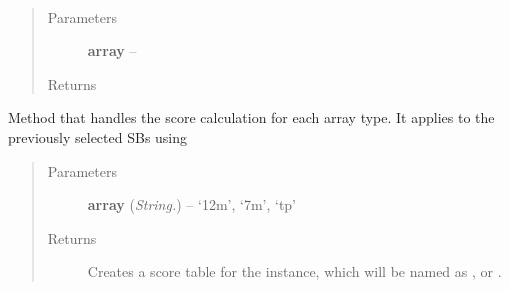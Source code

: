\documentclass[a4paper,10pt,english]{sphinxmanual}
\begin{document}
\begin{fulllineitems}
\begin{fulllineitems}
\end{fulllineitems}


\begin{fulllineitems}
\label{wtoapi:wtoAlgorithm.WtoAlgorithm.check_observability}~\begin{quote}\begin{description}
\item[{Parameters}] \leavevmode
\textbf{array} -- 

\item[{Returns}] \leavevmode


\end{description}\end{quote}

\end{fulllineitems}


\begin{fulllineitems}
\label{wtoapi:wtoAlgorithm.WtoAlgorithm.query_arrays}
\end{fulllineitems}


\begin{fulllineitems}
\label{wtoapi:wtoAlgorithm.WtoAlgorithm.scorer}
Method that handles the score calculation for each array type. It
applies  to the previously selected SBs using
\begin{quote}\begin{description}
\item[{Parameters}] \leavevmode
\textbf{array} (\emph{String.}) -- `12m', `7m', `tp'

\item[{Returns}] \leavevmode
Creates a score table for the instance, which will be named as
,  or .

\end{description}\end{quote}

\end{fulllineitems}



\end{fulllineitems}
\end{document}
